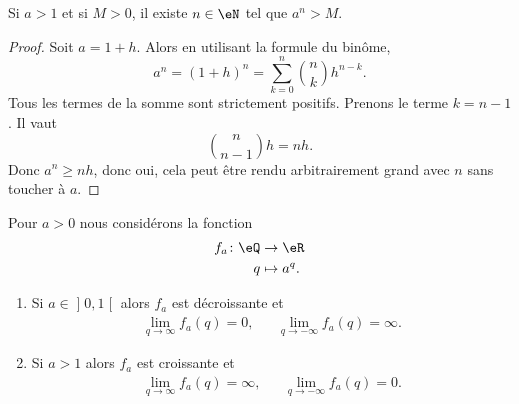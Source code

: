 \begin{proposition}\label{PROPooVXKBooQPPjMn}
    Si \( a>1\) et si \( M>0\), il existe \( n\in \eN\) tel que \( a^n>M\).
\end{proposition}

\begin{proof}
    Soit \( a=1+h\). Alors en utilisant la formule du binôme, 
    \begin{equation}
        a^n=(1+h)^n=\sum_{k=0}^n{n\choose k}h^{n-k}.
    \end{equation}
    Tous les termes de la somme sont strictement positifs. Prenons le terme \( k=n-1\). Il vaut
    \begin{equation}
        {n\choose n-1}h=nh.
    \end{equation}
    Donc \( a^n\geq nh\), donc oui, cela peut être rendu arbitrairement grand avec \( n\) sans toucher à \( a\).
\end{proof}

\begin{proposition}      \label{PROPooGCBZooTcyGtO}
    Pour \( a>0\) nous considérons la fonction
    \begin{equation}
        \begin{aligned}
            f_a\colon \eQ&\to \eR \\
            q&\mapsto a^q.
        \end{aligned}
    \end{equation}
    \begin{enumerate}
        \item
            Si \( a\in \mathopen] 0 , 1 \mathclose[\) alors \( f_a\) est décroissante et
            \begin{subequations}
                \begin{align}
                    \lim_{q\to \infty} f_a(q)=0,&& \lim_{q\to -\infty} f_a(q)=\infty.
                \end{align}
           \end{subequations}
         \item
            Si \( a>1\)  alors \( f_a\) est croissante et
            \begin{subequations}
                \begin{align}
                    \lim_{q\to \infty} f_a(q)=\infty,&& \lim_{q\to -\infty} f_a(q)=0.
                \end{align}
           \end{subequations}
    \end{enumerate}
\end{proposition}

